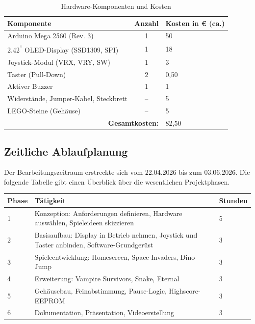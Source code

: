 \documentclass[12pt,a4paper]{article}
\begin{document}
\begin{table}[h]
\centering
\begin{tabularx}{\textwidth}{|l|c|X|}
\hline
\textbf{Komponente}               & \textbf{Anzahl} & \textbf{Kosten in € (ca.)} \\
\hline
Arduino Mega 2560 (Rev. 3)        & 1 & 50 \\
2.42\textsuperscript{''} OLED-Display (SSD1309, SPI) & 1 & 18 \\
Joystick-Modul (VRX, VRY, SW)     & 1 & 3 \\
Taster (Pull-Down)                & 2 & 0,50 \\
Aktiver Buzzer                    & 1 & 1 \\
Widerstände, Jumper-Kabel, Steckbrett & -- & 5 \\
LEGO-Steine (Gehäuse)             & -- & 5 \\
\hline
\multicolumn{2}{|r|}{\textbf{Gesamtkosten:}} & 82,50 \\
\hline
\end{tabularx}
\caption{Hardware-Komponenten und Kosten}
\end{table}

\subsection{Zeitliche Ablaufplanung}

Der Bearbeitungszeitraum erstreckte sich vom 22.04.2026 bis zum
03.06.2026. Die folgende Tabelle gibt einen Überblick über die wesentlichen Projektphasen.

\vspace{0.3cm}
\begin{tabularx}{\textwidth}{|l|X|l|}
\hline
\textbf{Phase} & \textbf{Tätigkeit} & \textbf{Stunden} \\
\hline
1 & Konzeption: Anforderungen definieren, Hardware auswählen,
    Spieleideen skizzieren & 5 \\
2 & Basisaufbau: Display in Betrieb nehmen, Joystick und Taster
    anbinden, Software-Grundgerüst & 3 \\
3 & Spieleentwicklung: Homescreen, Space Invaders, Dino Jump & 3 \\
4 & Erweiterung: Vampire Survivors, Snake, Eternal & 3 \\
5 & Gehäusebau, Feinabstimmung, Pause-Logic, Highscore-EEPROM & 3 \\
6 & Dokumentation, Präsentation, Videoerstellung & 3 \\
\hline
\end{tabularx}
\end{document}
